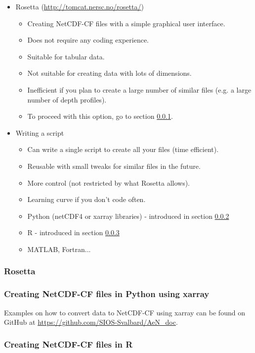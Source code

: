 \documentclass[a4paper,english, 11pt]{article}
\begin{document}
\begin{itemize}
\item Rosetta (\url{http://tomcat.nersc.no/rosetta/})
\begin{itemize}
\item Creating NetCDF-CF files with a simple graphical user interface. 
\item Does not require any coding experience.
\item Suitable for tabular data.
\item Not suitable for creating data with lots of dimensions.
\item Inefficient if you plan to create a large number of similar files (e.g. a large number of depth profiles).
\item To proceed with this option, go to section \ref{ss:Rosetta}.
\end{itemize}
\item Writing a script
\begin{itemize}
\item Can write a single script to create all your files (time efficient). 
\item Reusable with small tweaks for similar files in the future.
\item More control (not restricted by what Rosetta allows).
\item Learning curve if you don't code often.
\item Python (netCDF4 or xarray libraries) - introduced in section \ref{ss:xarray}
\item R - introduced in section \ref{ss:R}
\item MATLAB, Fortran...   
\end{itemize}
\end{itemize}

\subsubsection{Rosetta}
\label{ss:Rosetta}



\subsubsection{Creating NetCDF-CF files in Python using xarray}
\label{ss:xarray}

Examples on how to convert data to NetCDF-CF using xarray can be found on GitHub at \url{https://github.com/SIOS-Svalbard/AeN_doc}.


\subsubsection{Creating NetCDF-CF files in R}
\label{ss:R}
\end{document}
